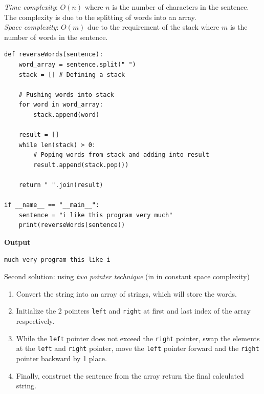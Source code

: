 \documentclass[a4paper,11pt]{book}
\begin{document}
\noindent \textit{Time complexity}: $O(n)$ where $n$ is the number of characters in the sentence. The complexity is due to the splitting of words into an array.\\
\noindent \textit{Space complexity}: $O(m)$ due to the requirement of the stack where $m$ is the number of words in the sentence.
\begin{lstlisting}
def reverseWords(sentence):
    word_array = sentence.split(" ")
    stack = [] # Defining a stack

    # Pushing words into stack
    for word in word_array:
        stack.append(word)

    result = []
    while len(stack) > 0:
        # Poping words from stack and adding into result
        result.append(stack.pop())
  
    return " ".join(result)

if __name__ == "__main__":
    sentence = "i like this program very much"
    print(reverseWords(sentence))
\end{lstlisting}
\textbf{Output}
\begin{lstlisting}
much very program this like i
\end{lstlisting}

\noindent Second solution: using \textit{two pointer technique} (in in constant space complexity)
\begin{enumerate}
    \item Convert the string into an array of strings, which will store the words.
    \item Initialize the 2 pointers \lstinline{left} and \lstinline{right} at first and last index of the array respectively.
    \item While the \lstinline{left} pointer does not exceed the \lstinline{right} pointer, swap the elements at the \lstinline{left} and \lstinline{right} pointer, move the \lstinline{left} pointer forward and the \lstinline{right} pointer backward by 1 place.
    \item Finally, construct the sentence from the array return the final calculated string.
\end{enumerate}

\vspace{5mm}
\end{document}
